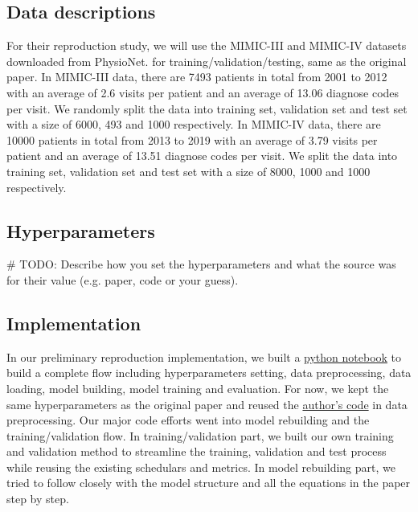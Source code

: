 \documentclass[11pt,a4paper]{article}
\begin{document}
\subsection{Data descriptions}
For their reproduction study, we will use the MIMIC-III \cite{mimic3} and MIMIC-IV
\cite{mimic4} datasets downloaded from PhysioNet\cite{physionet}. for training/validation/testing, same as the original paper. In MIMIC-III data, there are 7493 patients in total from 2001 to 2012 with an average of 2.6 visits per patient and an average of 13.06 diagnose codes per visit. We randomly split the data into training set, validation set and test set with a size of 6000, 493 and 1000 respectively. In MIMIC-IV data, there are 10000 patients in total from 2013 to 2019 with an average of 3.79 visits per patient and an average of 13.51 diagnose codes per visit. We split the data into training set, validation set and test set with a size of 8000, 1000 and 1000 respectively. 

\subsection{Hyperparameters}
\# TODO:
Describe how you set the hyperparameters and what the source was for their value (e.g. paper, code or your guess). 

\subsection{Implementation}
In our preliminary reproduction implementation, we built a \href{https://github.com/willtsai/dlh-sp23-team53/blob/main/notebook.ipynb}{python notebook} to build a complete flow including hyperparameters setting, 
data preprocessing, data loading, model building, model training and evaluation. For now, we kept the same hyperparameters as the original paper and reused the \href{https://github.com/LuChang-CS/Chet}{author's code} in data preprocessing.
Our major code efforts went into model rebuilding and the training/validation flow. In training/validation part, we built our own training and validation method to streamline the training, validation and test process while reusing the existing 
schedulars and metrics. In model rebuilding part, we tried to follow closely with the model structure and all the equations in the paper step by step.
\end{document}
